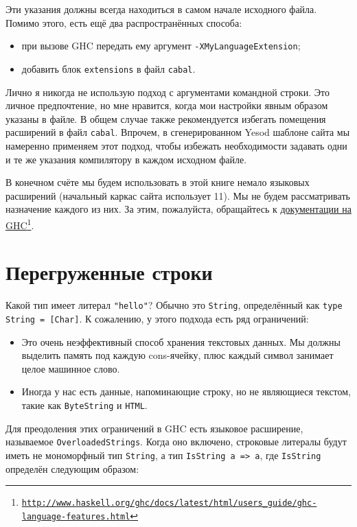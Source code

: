 Эти указания должны всегда находиться в самом начале исходного файла. Помимо этого, есть ещё два распространённых способа:
\begin{itemize}
\item при вызове GHC передать ему аргумент \lstinline'-XMyLanguageExtension';
\item добавить блок \texttt{extensions} в файл \texttt{cabal}.
\end{itemize}

Лично я никогда не использую подход с аргументами командной строки. Это личное предпочтение, но мне нравится, когда мои настройки явным образом указаны в файле. В общем случае также рекомендуется избегать помещения расширений в файл \texttt{cabal}. Впрочем, в сгенерированном Yesod шаблоне сайта  мы намеренно применяем этот подход, чтобы избежать необходимости задавать одни и те же указания компилятору в каждом исходном файле.

В конечном счёте мы будем использовать в этой книге немало языковых расширений (начальный каркас сайта использует 11). Мы не будем рассматривать назначение каждого из них. За этим, пожалуйста, обращайтесь к \href{http://www.haskell.org/ghc/docs/latest/html/users\_guide/ghc-language-features.html}{документации на GHC}\footnote{\href{http://www.haskell.org/ghc/docs/latest/html/users\_guide/ghc-language-features.html}{\texttt{http://www.haskell.org/ghc/docs/latest/html/users\_guide/ghc-language-features.html}}}.

\section{Перегруженные строки}

Какой тип имеет литерал \lstinline'"hello"'? Обычно это \lstinline'String', определённый как \lstinline'type String = [Char]'. К сожалению, у этого подхода есть ряд ограничений:
\begin{itemize}
\item Это очень неэффективный способ хранения текстовых данных. Мы должны выделить память под каждую cons-ячейку, плюс каждый символ занимает целое машинное слово.
\item Иногда у нас есть данные, напоминающие строку, но не являющиеся текстом, такие как \lstinline'ByteString' и \lstinline'HTML'.
\end{itemize}

Для преодоления этих ограничений в GHC есть языковое расширение, называемое \lstinline'OverloadedStrings'. Когда оно включено, строковые литералы будут иметь не мономорфный тип \lstinline'String', а тип \lstinline'IsString a => a', где \lstinline'IsString' определён следующим образом:

